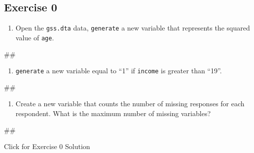 \documentclass[
]{book}
\newenvironment{Shaded}{\begin{snugshade}}{\end{snugshade}}
\newcommand{\NormalTok}[1]{#1}
\providecommand{\tightlist}{%
  \setlength{\itemsep}{0pt}\setlength{\parskip}{0pt}}
\begin{document}
\hypertarget{exercise-0-6}{%
\subsection{Exercise 0}\label{exercise-0-6}}

\begin{enumerate}
\def\labelenumi{\arabic{enumi}.}
\tightlist
\item
  Open the \texttt{gss.dta} data, \texttt{generate} a new variable that represents the squared value of \texttt{age}.
\end{enumerate}

\begin{Shaded}
\begin{Highlighting}[]
\NormalTok{\#\#}
\end{Highlighting}
\end{Shaded}

\begin{enumerate}
\def\labelenumi{\arabic{enumi}.}
\setcounter{enumi}{1}
\tightlist
\item
  \texttt{generate} a new variable equal to ``1'' if \texttt{income} is greater than ``19''.
\end{enumerate}

\begin{Shaded}
\begin{Highlighting}[]
\NormalTok{\#\#}
\end{Highlighting}
\end{Shaded}

\begin{enumerate}
\def\labelenumi{\arabic{enumi}.}
\setcounter{enumi}{2}
\tightlist
\item
  Create a new variable that counts the number of missing responses for each respondent. What is the maximum number of missing variables?
\end{enumerate}

\begin{Shaded}
\begin{Highlighting}[]
\NormalTok{\#\#}
\end{Highlighting}
\end{Shaded}

{Click for Exercise 0 Solution}
\end{document}

